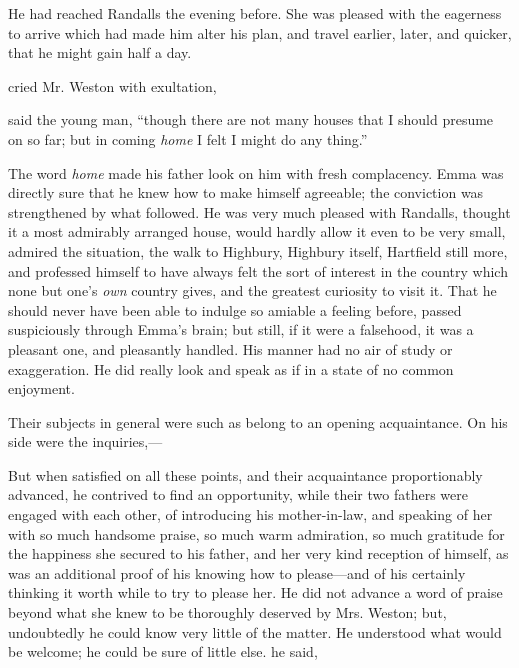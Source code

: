 He had reached Randalls the evening before. She was pleased with the eagerness to arrive which had made him alter his plan, and travel earlier, later, and quicker, that he might gain half a day.

 cried Mr. Weston with exultation, 

 said the young man, “though there are not many houses that I should presume on so far; but in coming {\em home} I felt I might do any thing.”

The word {\em home} made his father look on him with fresh complacency. Emma was directly sure that he knew how to make himself agreeable; the conviction was strengthened by what followed. He was very much pleased with Randalls, thought it a most admirably arranged house, would hardly allow it even to be very small, admired the situation, the walk to Highbury, Highbury itself, Hartfield still more, and professed himself to have always felt the sort of interest in the country which none but one's {\em own} country gives, and the greatest curiosity to visit it. That he should never have been able to indulge so amiable a feeling before, passed suspiciously through Emma's brain; but still, if it were a falsehood, it was a pleasant one, and pleasantly handled. His manner had no air of study or exaggeration. He did really look and speak as if in a state of no common enjoyment.

Their subjects in general were such as belong to an opening acquaintance. On his side were the inquiries,---

But when satisfied on all these points, and their acquaintance proportionably advanced, he contrived to find an opportunity, while their two fathers were engaged with each other, of introducing his mother-in-law, and speaking of her with so much handsome praise, so much warm admiration, so much gratitude for the happiness she secured to his father, and her very kind reception of himself, as was an additional proof of his knowing how to please---and of his certainly thinking it worth while to try to please her. He did not advance a word of praise beyond what she knew to be thoroughly deserved by Mrs. Weston; but, undoubtedly he could know very little of the matter. He understood what would be welcome; he could be sure of little else.  he said, 

